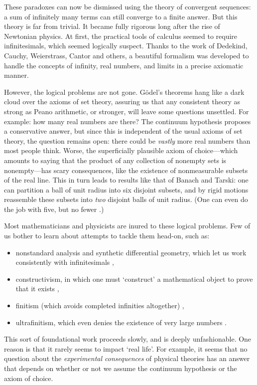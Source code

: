 \documentclass{article}
\begin{document}
These paradoxes can now be dismissed using the theory of convergent sequences:
a sum of infinitely many terms can still converge to a finite answer.  But this theory is far from trivial.  It became fully rigorous long after the rise of Newtonian physics.  At first, the practical tools of calculus seemed to require infinitesimals, which seemed logically suspect.  Thanks to the work of Dedekind, Cauchy, Weierstrass, Cantor and others, a beautiful formalism was developed to handle the concepts of infinity, real numbers, and limits in a precise axiomatic manner. 

However, the logical problems are not gone.  G\"odel's theorems hang like  a dark cloud over the axioms of set theory, assuring us that any consistent theory as strong as Peano arithmetic, or stronger, will leave some questions unsettled.  For example: how many real numbers are there?   The continuum hypothesis proposes a conservative answer, but since this is independent of the usual axioms of set theory, the question remains open: there could be \emph{vastly} more real numbers than most people think.  Worse, the superficially plausible axiom of choice---which amounts to saying that the product of  any collection of nonempty sets is nonempty---has scary consequences, like the existence of nonmeasurable subsets of the real line.  This in turn leads to results like that of
Banach and Tarski: one can partition a ball of unit radius into six disjoint subsets, and by rigid motions reassemble  these subsets into {\it two} disjoint balls of unit radius.  
(One can even do the job with five, but no fewer \cite{Wagon}.)

Most mathematicians and physicists are inured to these logical problems.  Few of us bother to learn about attempts to tackle them head-on, such as:
\begin{itemize}
\item nonstandard analysis and synthetic differential geometry, which let us work consistently with infinitesimals \cite{Kock1,Kock2,LoebWolff,Robinson},
\item constructivism, in which one must `construct' a mathematical object to prove that it exists \cite{Bishop},
\item  finitism (which avoids completed infinities altogether) \cite{Ye},
\item ultrafinitism, which even denies the existence of very large numbers \cite{Boucher}.
\end{itemize}
This sort of foundational work proceeds slowly, and is deeply unfashionable.  One reason is that 
it rarely seems to impact `real life'.   For example, it seems that no question about the \emph{experimental consequences} of physical theories has an answer that depends on whether 
or not we assume the continuum hypothesis or the axiom of choice.  
\end{document}

